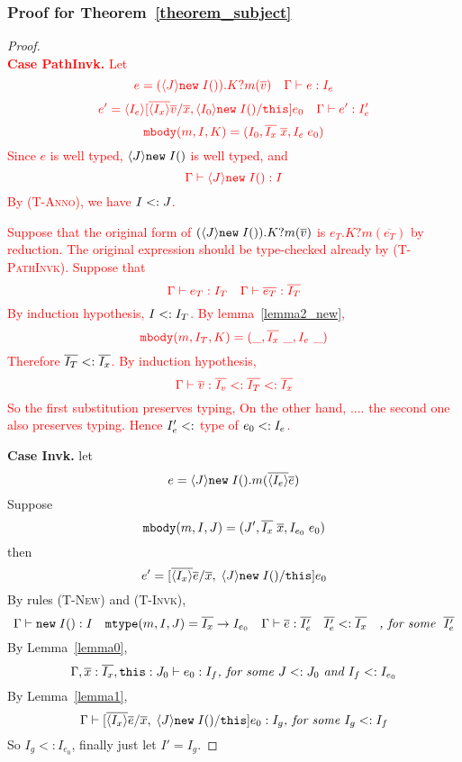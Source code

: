 \subsubsection{Proof for Theorem~\ref{theorem_subject}}
\begin{proof} ~\\
\noindent\textcolor{red}{\textbf{Case PathInvk.} Let} 
  $$\textcolor{red}{e = (\langle J \rangle\texttt{new} \; I()).K?m(\overline{v}) \quad \Gamma \; {\vdash} \; e : I_e}$$
  $$\textcolor{red}{e' = \langle I_e \rangle[\overline{\langle I_x \rangle} \overline{v}/\overline{x}, \langle I_0 \rangle\texttt{new} \; I()/\texttt{this}]e_0 \quad \Gamma \; {\vdash} \; e' : I'_e}$$
  $$\textcolor{red}{\texttt{mbody}(m, I, K) = (I_0, \overline{I_x} \; \overline{x}, I_e \; e_0)}$$
\textcolor{red}{Since $e$ is well typed, $\langle J \rangle\texttt{new} \; I()$ is well typed, and}
  $$\textcolor{red}{\Gamma \; {\vdash} \; \langle J \rangle\texttt{new} \; I() : I}$$
\textcolor{red}{By \textsc{(T-Anno)}, we have $I <: J$.}

\noindent\textcolor{red}{Suppose that the original form of $(\langle J \rangle\texttt{new} \; I()).K?m(\overline{v})$ is $e_T.K?m(\overline{e_T})$ by reduction.
	The original expression should be type-checked already by \textsc{(T-PathInvk)}. Suppose that}
  $$\textcolor{red}{\Gamma \; {\vdash} \; e_T : I_T \quad \Gamma \; {\vdash} \; \overline{e_T} : \overline{I_T}}$$
\textcolor{red}{By induction hypothesis, $I <: I_T$. By lemma~\ref{lemma2_new},}
  $$\textcolor{red}{\texttt{mbody}(m, I_T, K) = (\_, \overline{I_x}\ \_, I_e\ \_)}$$
\textcolor{red}{Therefore $\overline{I_T} <: \overline{I_x}$. By induction hypothesis,}
  $$\textcolor{red}{\Gamma \; {\vdash} \; \overline{v} : \overline{I_v} <: \overline{I_T} <: \overline{I_x}}$$
\textcolor{red}{So the first substitution preserves typing, On the other hand, .... the second one also preserves typing. Hence $I'_e <:$ type of $e_0 <: I_e$.}

\noindent \textbf{Case Invk.} 
let \[ e = \langle J \rangle\texttt{new} \; I().m(\overline{\langle I_e \rangle}\overline{e}) \] 
Suppose \[ \texttt{mbody}(m, I, J) = (J', \overline{I_x} \; \overline{x}, I_{e_0} \; e_0) \] 
then \[ e' =  [\overline{\langle I_x \rangle} \overline{e}/\overline{x}, \; \langle J \rangle\texttt{new} \; I()/\texttt{this} ] e_0 \] 
By rules \textsc{(T-New)} and \textsc{(T-Invk)}, 
  \[ \Gamma \; {\vdash} \; \texttt{new} \; I():I \quad 
     \texttt{mtype}(m, I, J) = \overline{I_x} \rightarrow I_{e_0} \quad 
     \Gamma \; {\vdash} \; \overline{e} : \overline{I_e'} \quad
     \overline{I_e'} <: \overline{I_x} \quad
     \textit{, for some } \; \overline{I_e'}
  \]
By Lemma~\ref{lemma0},
    \[
    \Gamma, \overline{x}:\overline{I_x}, \texttt{this}:J_0 \; {\vdash} \; e_0:I_f \textit{, for some } J <: J_0 \textit{ and } I_f <: I_{e_0}
    \]
By Lemma~\ref{lemma1},
    \[
    \Gamma \; {\vdash} \; [\overline{\langle I_x \rangle} \overline{e}/\overline{x}, \; \langle J \rangle\texttt{new} \; I()/\texttt{this} ] e_0  :  I_g \textit{, for some } I_g <: I_f 
    \]
So $I_g <: I_{e_0}$, finally just let $I' = I_g$.


\end{proof}
